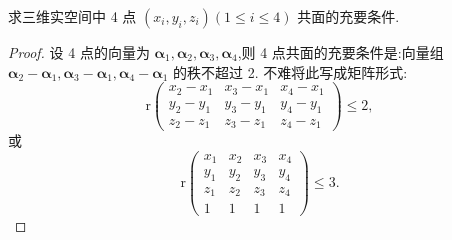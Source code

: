 \documentclass[../../main.tex]{subfiles}%
\begin{document}
\begin{proposition}\label{proposition:三维实空间中4点共面}
求三维实空间中 4 点 \((x_i,y_i,z_i)(1\leqslant  i\leqslant  4)\) 共面的充要条件.
\end{proposition}
\begin{proof}

设 4 点的向量为 \(\boldsymbol{\alpha}_1,\boldsymbol{\alpha}_2,\boldsymbol{\alpha}_3,\boldsymbol{\alpha}_4\),则 4 点共面的充要条件是:向量组 \(\boldsymbol{\alpha}_2 - \boldsymbol{\alpha}_1,\boldsymbol{\alpha}_3 - \boldsymbol{\alpha}_1,\boldsymbol{\alpha}_4 - \boldsymbol{\alpha}_1\) 的秩不超过 2. 不难将此写成矩阵形式:
\[
\mathrm{r}\begin{pmatrix}
x_2 - x_1&x_3 - x_1&x_4 - x_1\\
y_2 - y_1&y_3 - y_1&y_4 - y_1\\
z_2 - z_1&z_3 - z_1&z_4 - z_1
\end{pmatrix}\leqslant 2,
\]
或
\[
\mathrm{r}\begin{pmatrix}
x_1&x_2&x_3&x_4\\
y_1&y_2&y_3&y_4\\
z_1&z_2&z_3&z_4\\
1&1&1&1
\end{pmatrix}\leqslant 3. 
\]

\end{proof}
\end{document}
